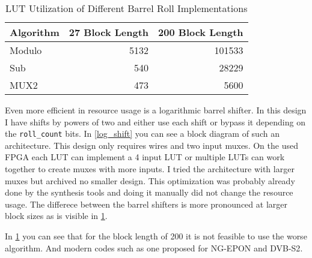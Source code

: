 \begin{table}
    \begin{tabular}{l r r}
        Algorithm & 27 Block Length & 200 Block Length \\ \toprule
        Modulo & 5132 & 101533 \\
        Sub & 540 &  28229\\
        MUX2 & 473 & 5600
    \end{tabular}
    \centering
    \caption{LUT Utilization of Different Barrel Roll Implementations}
    \label{roll_usage}
\end{table}

Even more efficient in resource usage is a logarithmic barrel shifter. In this design I have shifts by powers of two and either use each shift or bypass it depending on the \lstinline{roll_count} bits. In \cref{log_shift} you can see a block diagram of such an architecture. This design only requires wires and two input muxes. On the used FPGA each LUT can implement a 4 input LUT or multiple LUTs can work together to create muxes with more inputs. I tried the architecture with larger muxes but archived no smaller design. This optimization was probably already done by the synthesis tools and doing it manually did not change the resource usage. The differece between the barrel shifters is more pronounced at larger block sizes as is visible in \cref{roll_usage}.

In \cref{roll_usage} you can see that for the block length of 200 it is not feasible to use the worse algorithm. And modern codes such as one proposed for NG-EPON\cite{wey_3ca_1a_0118} and DVB-S2\cite{ETSI_EN_302_307}.

